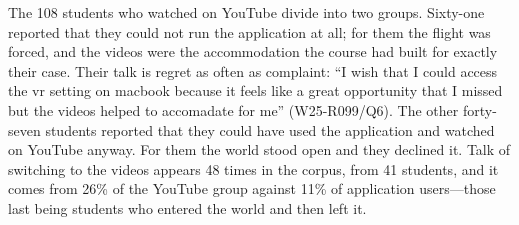 The 108 students who watched on YouTube divide into two groups. Sixty-one
reported that they could not run the application at all; for them the
flight was forced, and the videos were the accommodation the course had
built for exactly their case. Their talk is regret as often as complaint: ``I wish
that I could access the vr setting on macbook because it feels like a great
opportunity that I missed but the videos helped to accomadate for me''
(W25-R099/Q6). The other forty-seven students reported that they could have
used the application and watched on YouTube anyway. For them the world
stood open and they declined it. Talk of switching to the videos appears 48
times in the corpus, from 41 students, and it comes from 26\% of the
YouTube group against 11\% of application users---those last being students
who entered the world and then left it.

